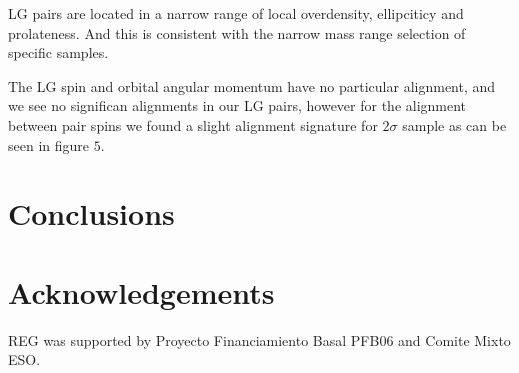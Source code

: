 \documentclass{emulateapj}
\begin{document}
LG pairs are located in a narrow range of local overdensity, ellipciticy and prolateness.
And this is consistent with the narrow mass range selection of specific samples.

The LG spin and orbital angular momentum have no particular alignment,
and we see no significan alignments in our LG pairs, however for the alignment
between pair spins we found a slight alignment signature for $2\sigma$ sample as
can be seen in figure $5$.

\section{Conclusions}
\label{sec:conclusions}


\section*{Acknowledgements}
REG was supported by Proyecto Financiamiento Basal PFB06 and Comite Mixto ESO.


 
\end{document}
